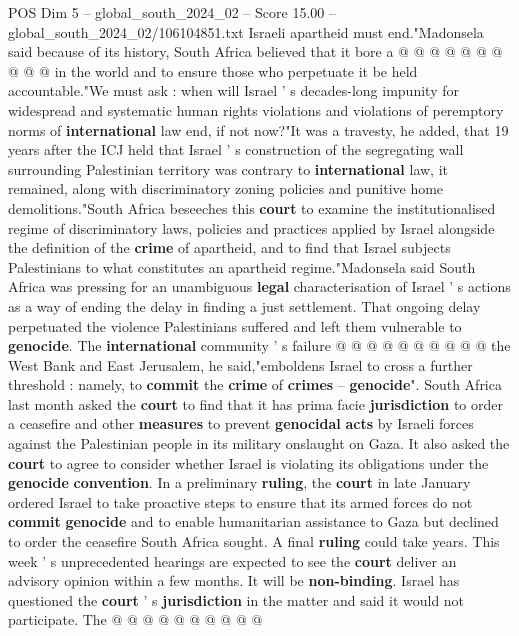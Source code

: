 \begin{textsample}{POS Dim 5 – global\_south\_2024\_02 – Score 15.00 – global\_south\_2024\_02/106104851.txt}
Israeli apartheid must end."Madonsela said because of its history, South Africa believed that it bore a @ @ @ @ @ @ @ @ @ @ in the world and to ensure those who perpetuate it be held accountable."We must ask : when will Israel ' s decades-long impunity for widespread and systematic human rights violations and violations of peremptory norms of \textbf{international} law end, if not now?"It was a travesty, he added, that 19 years after the ICJ held that Israel ' s construction of the segregating wall surrounding Palestinian territory was contrary to \textbf{international} law, it remained, along with discriminatory zoning policies and punitive home demolitions."South Africa beseeches this \textbf{court} to examine the institutionalised regime of discriminatory laws, policies and practices applied by Israel alongside the definition of the \textbf{crime} of apartheid, and to find that Israel subjects Palestinians to what constitutes an apartheid regime."Madonsela said South Africa was pressing for an unambiguous \textbf{legal} characterisation of Israel ' s actions as a way of ending the delay in finding a just settlement.
That ongoing delay perpetuated the violence Palestinians suffered and left them vulnerable to \textbf{genocide}.
The \textbf{international} community ' s failure @ @ @ @ @ @ @ @ @ @ the West Bank and East Jerusalem, he said,"emboldens Israel to cross a further threshold : namely, to \textbf{commit} the \textbf{crime} of \textbf{crimes} -- \textbf{genocide}".
South Africa last month asked the \textbf{court} to find that it has prima facie \textbf{jurisdiction} to order a ceasefire and other \textbf{measures} to prevent \textbf{genocidal} \textbf{acts} by Israeli forces against the Palestinian people in its military onslaught on Gaza.
It also asked the \textbf{court} to agree to consider whether Israel is violating its obligations under the \textbf{genocide} \textbf{convention}.
In a preliminary \textbf{ruling}, the \textbf{court} in late January ordered Israel to take proactive steps to ensure that its armed forces do not \textbf{commit} \textbf{genocide} and to enable humanitarian assistance to Gaza but declined to order the ceasefire South Africa sought.
A final \textbf{ruling} could take years.
This week ' s unprecedented hearings are expected to see the \textbf{court} deliver an advisory opinion within a few months.
It will be \textbf{non-binding}.
Israel has questioned the \textbf{court} ' s \textbf{jurisdiction} in the matter and said it would not participate.
The @ @ @ @ @ @ @ @ @ @

\end{textsample}
